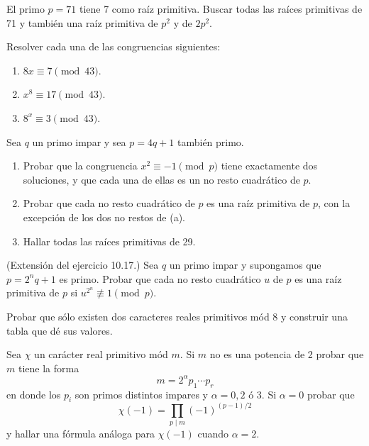 \documentclass[12pt,a4paper]{book}
\begin{document}
    \begin{ejercicio}
        El primo $p=71$ tiene 7 como raíz primitiva. Buscar todas las raíces primitivas de
        71 y también una raíz primitiva de $p^{2}$ y de $2p^{2}$.
    \end{ejercicio}

    \begin{ejercicio}
        Resolver cada una de las congruencias siguientes:
        \begin{enumerate}
            \item[(a)] $8x\equiv7\pmod{43}$.
            \item[(b)] $x^{8}\equiv17\pmod{43}$.
            \item[(c)] $8^{x}\equiv3\pmod{43}$.
        \end{enumerate}
    \end{ejercicio}

    \begin{ejercicio}
        Sea $q$ un primo impar y sea $p=4q+1$ también primo.
        \begin{enumerate}
            \item[(a)] Probar que la congruencia $x^{2}\equiv-1\pmod{p}$ tiene exactamente dos
            soluciones, y que cada una de ellas es un no resto cuadrático de $p$.
            \item[(b)] Probar que cada no resto cuadrático de $p$ es una raíz primitiva de
            $p$, con la excepción de los dos no restos de (a).
            \item[(c)] Hallar todas las raíces primitivas de 29.
        \end{enumerate}
    \end{ejercicio}

    \begin{ejercicio}
        (Extensión del ejercicio 10.17.) Sea $q$ un primo impar y supongamos que
        $p=2^{n}q+1$ es primo. Probar que cada no resto cuadrático $u$ de $p$ es una raíz
        primitiva de $p$ si $u^{2^{n}}\not\equiv1\pmod{p}$.
    \end{ejercicio}

    \begin{ejercicio}
        Probar que sólo existen dos caracteres reales primitivos mód 8 y construir una tabla
        que dé sus valores.
    \end{ejercicio}

    \begin{ejercicio}
        Sea $\chi$ un carácter real primitivo mód $m$. Si $m$ no es una potencia de 2 probar
        que $m$ tiene la forma
        \begin{equation*}
            m=2^{\alpha}p_{1}\cdots p_{r}
        \end{equation*}
        en donde los $p_{i}$ son primos distintos impares y $\alpha=0,2$ ó 3. Si $\alpha=0$
        probar que
        \begin{equation*}
            \chi(-1)=\prod_{p\mid m}(-1)^{(p-1)/2}
        \end{equation*}
        y hallar una fórmula análoga para $\chi(-1)$ cuando $\alpha=2$.
    \end{ejercicio}
\end{document}
